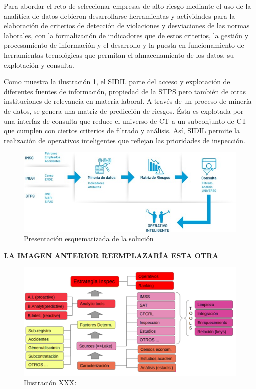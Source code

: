 \documentclass[
]{article}
\begin{document}
Para abordar el reto de seleccionar empresas de alto riesgo mediante el uso de la analítica de datos debieron desarrollarse herramientas y actividades para la elaboración de criterios de detección de violaciones y desviaciones de las normas laborales, con la formalización de indicadores que de estos criterios, la gestión y procesamiento de información y el desarrollo y la puesta en funcionamiento de herramientas tecnológicas que permitan el almacenamiento de los datos, su explotación y consulta.

Como muestra la ilustración \ref{fig:esquemaPPTSalafranca}, el SIDIL parte del acceso y explotación de diferentes fuentes de información, propiedad de la STPS pero también de otras instituciones de relevancia en materia laboral. A través de un proceso de minería de datos, se genera una matriz de predicción de riesgos. Ésta es explotada por una interfaz de consulta que reduce el universo de CT a un subconjunto de CT que cumplen con ciertos criterios de filtrado y análisis. Así, SIDIL permite la realización de operativos inteligentes que reflejan las prioridades de inspección.

\begin{figure}
\includegraphics[width=0.5\linewidth]{images-1/01/esquemaPPTSalafranca} \caption{Presentación esquematizada de la solución}\label{fig:esquemaPPTSalafranca}
\end{figure}

\textbf{LA IMAGEN ANTERIOR REEMPLAZARÍA ESTA OTRA}

\begin{figure}
\centering
\includegraphics{images-1/01/Ilustracion1.png}
\caption{Ilustración XXX:}
\end{figure}
\end{document}
